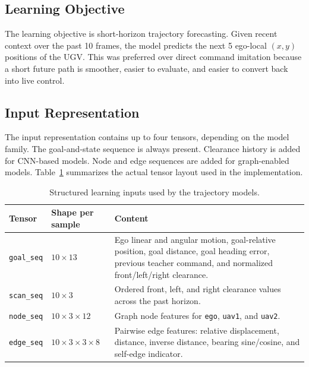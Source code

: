 \subsection{Learning Objective}

The learning objective is short-horizon trajectory forecasting. Given recent context over the past 10 frames, the model predicts the next 5 ego-local $(x,y)$ positions of the UGV. This was preferred over direct command imitation because a short future path is smoother, easier to evaluate, and easier to convert back into live control.

\subsection{Input Representation}

The input representation contains up to four tensors, depending on the model family. The goal-and-state sequence is always present. Clearance history is added for CNN-based models. Node and edge sequences are added for graph-enabled models. Table~\ref{tab:model_input_summary} summarizes the actual tensor layout used in the implementation.

\begin{table}[tbp]
    \caption{Structured learning inputs used by the trajectory models.}
    \label{tab:model_input_summary}
    \centering
    \small
    \setlength{\tabcolsep}{4pt}
    \renewcommand{\arraystretch}{1.15}
    \begin{tabularx}{\textwidth}{@{}>{\raggedright\arraybackslash}p{}>{\raggedright\arraybackslash}p{}X@{}}
        \toprule
        \textbf{Tensor} & \textbf{Shape per sample} & \textbf{Content} \\
        \midrule
        \texttt{goal\_seq} & $10 \times 13$ & Ego linear and angular motion, goal-relative position, goal distance, goal heading error, previous teacher command, and normalized front/left/right clearance. \\
        \texttt{scan\_seq} & $10 \times 3$ & Ordered front, left, and right clearance values across the past horizon. \\
        \texttt{node\_seq} & $10 \times 3 \times 12$ & Graph node features for \texttt{ego}, \texttt{uav1}, and \texttt{uav2}. \\
        \texttt{edge\_seq} & $10 \times 3 \times 3 \times 8$ & Pairwise edge features: relative displacement, distance, inverse distance, bearing sine/cosine, and self-edge indicator. \\
        \bottomrule
    \end{tabularx}
\end{table}

